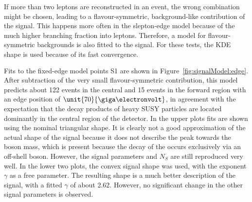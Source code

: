 If more than two leptons are reconstructed in an event, the wrong combination might be chosen, leading to a flavour-symmetric, background-like contribution of the signal. This happens more often in the slepton-edge model because of the much higher branching fraction into leptons. Therefore, a model for flavour-symmetric backgrounds is also fitted to the signal. For these tests, the KDE shape is used because of its fast convergence. 

Fits to the fixed-edge model points S1 are shown in Figure~\ref{fig:signalModel:edge}. After subtraction of the very small flavour-symmetric contribution, this model predicts about 122 events in the central and 15 events in the forward region with an edge position of $\unit{70}{\giga\electronvolt}$, in agreement with the expectation that the decay products of heavy SUSY particles are located dominantly in the central region of the detector. In the upper plots fits are shown using the nominal triangular shape. It is clearly not a good approximation of the actual shape of the signal because it does not describe the peak towards the \Z boson mass, which is present because the decay of the \secondchi occurs exclusively via an off-shell \Z boson. However, the signal parameters \mlledge and $N_S$ are still reproduced very well. In the lower two plots, the convex signal shape was used, with the exponent $\gamma$ as a free parameter. The resulting shape is a much better description of the signal, with a fitted $\gamma$ of about 2.62. However, no significant change in the other signal parameters is observed. 

